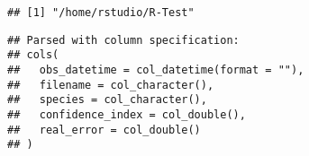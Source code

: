 \documentclass[]{article}
\newenvironment{Shaded}{\begin{snugshade}}{\end{snugshade}}
\newcommand{\KeywordTok}[1]{\textcolor[rgb]{0.13,0.29,0.53}{\textbf{#1}}}
\newcommand{\DataTypeTok}[1]{\textcolor[rgb]{0.13,0.29,0.53}{#1}}
\newcommand{\StringTok}[1]{\textcolor[rgb]{0.31,0.60,0.02}{#1}}
\newcommand{\CommentTok}[1]{\textcolor[rgb]{0.56,0.35,0.01}{\textit{#1}}}
\newcommand{\OtherTok}[1]{\textcolor[rgb]{0.56,0.35,0.01}{#1}}
\newcommand{\OperatorTok}[1]{\textcolor[rgb]{0.81,0.36,0.00}{\textbf{#1}}}
\newcommand{\NormalTok}[1]{#1}
\begin{document}
\begin{verbatim}
## [1] "/home/rstudio/R-Test"
\end{verbatim}

\begin{Shaded}
\end{Shaded}

\begin{verbatim}
## Parsed with column specification:
## cols(
##   obs_datetime = col_datetime(format = ""),
##   filename = col_character(),
##   species = col_character(),
##   confidence_index = col_double(),
##   real_error = col_double()
## )
\end{verbatim}
\end{document}
